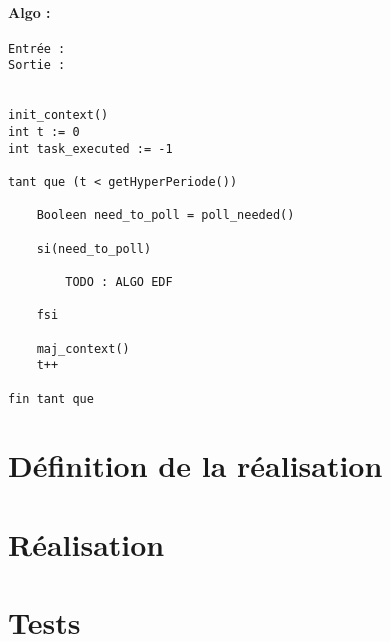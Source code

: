 				\paragraph{Algo :} 
					\begin{verbatim}
Entrée : 
Sortie :  


init_context()
int t := 0
int task_executed := -1

tant que (t < getHyperPeriode())
	
	Booleen need_to_poll = poll_needed()
	
	si(need_to_poll)
		
		TODO : ALGO EDF
		
	fsi
	
	maj_context()
	t++
	
fin tant que
					\end{verbatim}
				

	\section{Définition de la réalisation}

	\section{Réalisation}

	\section{Tests}

